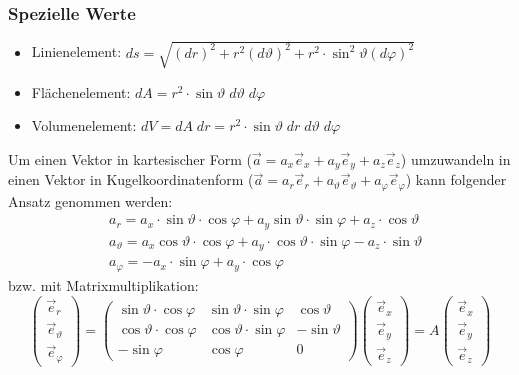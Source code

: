 \documentclass[a4paper,10pt]{scrartcl}
\begin{document}
            \subsubsection*{Spezielle Werte}
            \begin{itemize}
                \item Linienelement: \(ds = \sqrt{(dr)^2 + r^2(d\vartheta)^2 + r^2 \cdot \sin^2 \vartheta (d\varphi)^2} \)
                \item Flächenelement: \(dA = r^2 \cdot \sin \vartheta \; d\vartheta \; d\varphi \)
                \item Volumenelement: \(dV = dA \; dr = r^2 \cdot \sin \vartheta \; dr \; d\vartheta \; d\varphi\)
            \end{itemize}
            Um einen Vektor in kartesischer Form (\(\vec{a} = a_x\vec{e}_x + a_y \vec{e}_y + a_z \vec{e}_z \)) umzuwandeln in einen Vektor in Kugelkoordinatenform 
            (\(\vec{a} = a_r\vec{e}_r + a_\vartheta\vec{e}_\vartheta + a_\varphi\vec{e}_\varphi\)) kann folgender Ansatz genommen werden:
            \begin{equation*}
                \begin{aligned}
                    & a_r = a_x \cdot \sin \vartheta \cdot \cos \varphi + a_y \sin \vartheta \cdot \sin \varphi + a_z \cdot \cos \vartheta \\
                    & a_\vartheta = a_x \cos \vartheta \cdot \cos \varphi + a_y \cdot \cos \vartheta \cdot \sin \varphi - a_z \cdot \sin \vartheta \\
                    & a_\varphi = -a_x \cdot \sin \varphi + a_y \cdot \cos \varphi
                \end{aligned}
            \end{equation*}
            bzw. mit Matrixmultiplikation: 
            \begin{equation*}
                \begin{pmatrix}
                    \vec{e}_r \\ \vec{e}_\vartheta \\ \vec{e}_\varphi 
                \end{pmatrix} = 
                \begin{pmatrix}
                    \sin \vartheta \cdot \cos \varphi & \sin \vartheta \cdot \sin \varphi & \cos \vartheta \\
                    \cos \vartheta \cdot \cos \varphi & \cos \vartheta \cdot \sin \varphi & - \sin \vartheta \\
                    -\sin \varphi & \cos \varphi & 0
                \end{pmatrix}
                \begin{pmatrix}
                    \vec{e}_x \\ \vec{e}_y \\ \vec{e}_z
                \end{pmatrix} = A
                \begin{pmatrix}
                    \vec{e}_x \\ \vec{e}_y \\ \vec{e}_z
                \end{pmatrix}
            \end{equation*}
\end{document}
